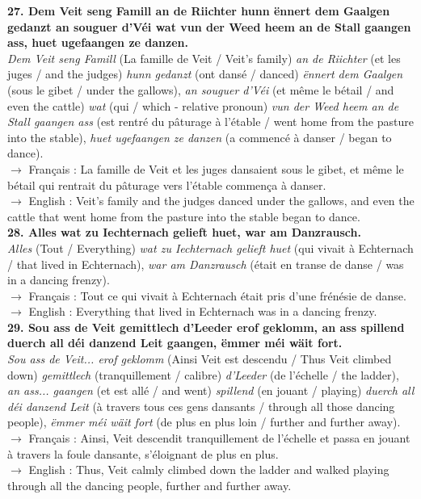 \textbf{27. Dem Veit seng Famill an de Riichter hunn ënnert dem Gaalgen gedanzt an souguer d'Véi wat vun der Weed heem an de Stall gaangen ass, huet ugefaangen ze danzen.}\\
\textit{Dem Veit seng Famill} (La famille de Veit / Veit's family) \textit{an de Riichter} (et les juges / and the judges) \textit{hunn gedanzt} (ont dansé / danced) \textit{ënnert dem Gaalgen} (sous le gibet / under the gallows), \textit{an souguer d'Véi} (et même le bétail / and even the cattle) \textit{wat} (qui / which - relative pronoun) \textit{vun der Weed heem an de Stall gaangen ass} (est rentré du pâturage à l'étable / went home from the pasture into the stable), \textit{huet ugefaangen ze danzen} (a commencé à danser / began to dance).\\
$\rightarrow$ Français : La famille de Veit et les juges dansaient sous le gibet, et même le bétail qui rentrait du pâturage vers l'étable commença à danser.\\
$\rightarrow$ English : Veit's family and the judges danced under the gallows, and even the cattle that went home from the pasture into the stable began to dance.\\[0.5em]

\textbf{28. Alles wat zu Iechternach gelieft huet, war am Danzrausch.}\\
\textit{Alles} (Tout / Everything) \textit{wat zu Iechternach gelieft huet} (qui vivait à Echternach / that lived in Echternach), \textit{war am Danzrausch} (était en transe de danse / was in a dancing frenzy).\\
$\rightarrow$ Français : Tout ce qui vivait à Echternach était pris d'une frénésie de danse.\\
$\rightarrow$ English : Everything that lived in Echternach was in a dancing frenzy.\\[0.5em]

\textbf{29. Sou ass de Veit gemittlech d'Leeder erof geklomm, an ass spillend duerch all déi danzend Leit gaangen, ëmmer méi wäit fort.}\\
\textit{Sou ass de Veit... erof geklomm} (Ainsi Veit est descendu / Thus Veit climbed down) \textit{gemittlech} (tranquillement / calibre) \textit{d'Leeder} (de l'échelle / the ladder), \textit{an ass... gaangen} (et est allé / and went) \textit{spillend} (en jouant / playing) \textit{duerch all déi danzend Leit} (à travers tous ces gens dansants / through all those dancing people), \textit{ëmmer méi wäit fort} (de plus en plus loin / further and further away).\\
$\rightarrow$ Français : Ainsi, Veit descendit tranquillement de l'échelle et passa en jouant à travers la foule dansante, s'éloignant de plus en plus.\\
$\rightarrow$ English : Thus, Veit calmly climbed down the ladder and walked playing through all the dancing people, further and further away.\\[0.5em]

